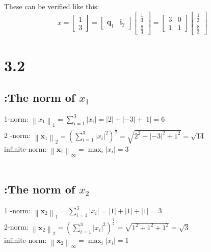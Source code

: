 \documentclass{article}
\newcommand{\rmnum}[1]{\romannumeral #1}
\begin{document}
These can be verified like this:
$$
x=\left[\begin{array}{l}
1 \\
3
\end{array}\right]=\left[\begin{array}{ll}
\boldsymbol{q}_{1} & \boldsymbol{i}_{2}
\end{array}\right]\left[\begin{array}{l}
\frac{1}{3} \\
\frac{8}{3}
\end{array}\right]=\left[\begin{array}{ll}
3 & 0 \\
1 & 1
\end{array}\right]\left[\begin{array}{l}
\frac{1}{3} \\
\frac{8}{3}
\end{array}\right]
$$
\section*{3.2}
\subsection*{\rmnum{1}:The norm of $x_{1}$}
1-norm: $\left\|x_{1}\right\|_{1}=\sum_{i=1}^{3}\left|x_{i}\right|=|2|+|-3|+|1|=6$\\
2 -norm: $\left\|\boldsymbol{x}_{1}\right\|_{2}=\left(\sum_{i=1}^{3}\left|x_{i}\right|^{2}\right)^{\frac{1}{2}}=\sqrt{2^{2}+|-3|^{2}+1^{2}}=\sqrt{14}$\\
infinite-norm: $\left\|\boldsymbol{x}_{1}\right\|_{\infty}=\max _{i}\left|x_{i}\right|=3$\\\
\subsection*{\rmnum{2}:The norm of $x_{2}$}
1 -norm: $\left\|\boldsymbol{x}_{2}\right\|_{1}=\sum_{i=1}^{3}\left|x_{i}\right|=|1|+|1|+|1|=3$\\
2-norm: $\left\|\boldsymbol{x}_{2}\right\|_{2}=\left(\sum_{i=1}^{3}\left|x_{i}\right|^{2}\right)^{\frac{1}{2}}=\sqrt{1^{2}+1^{2}+1^{2}}=\sqrt{3}$\\
infinite-norm: $\left\|\boldsymbol{x}_{2}\right\|_{\infty}=\max _{i}\left|x_{i}\right|=1$\\
\end{document}
